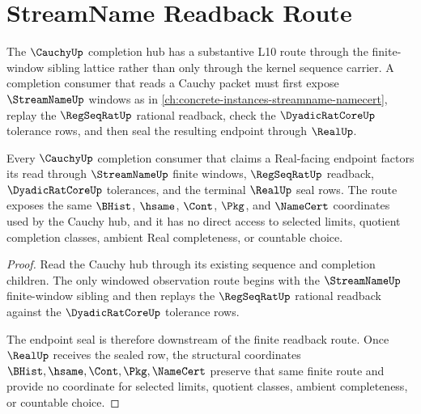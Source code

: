 \section{StreamName Readback Route}
\label{sec:cauchy-orphan-streamname-route}

The $\CauchyUp$ completion hub has a substantive L10 route through the finite-window sibling lattice rather than only through the kernel sequence carrier. A completion consumer that reads a Cauchy packet must first expose $\StreamNameUp$ windows as in \autoref{ch:concrete-instances-streamname-namecert}, replay the $\RegSeqRatUp$ rational readback, check the $\DyadicRatCoreUp$ tolerance rows, and then seal the resulting endpoint through $\RealUp$.

\begin{theorem}
\label{thm:cauchy-orphan-streamname-route}
Every $\CauchyUp$ completion consumer that claims a Real-facing endpoint factors its read through $\StreamNameUp$ finite windows, $\RegSeqRatUp$ readback, $\DyadicRatCoreUp$ tolerances, and the terminal $\RealUp$ seal rows. The route exposes the same $\BHist$, $\hsame$, $\Cont$, $\Pkg$, and $\NameCert$ coordinates used by the Cauchy hub, and it has no direct access to selected limits, quotient completion classes, ambient Real completeness, or countable choice.
\end{theorem}
\begin{proof}
Read the Cauchy hub through its existing sequence and completion children. The only windowed observation route begins with the $\StreamNameUp$ finite-window sibling and then replays the $\RegSeqRatUp$ rational readback against the $\DyadicRatCoreUp$ tolerance rows.

The endpoint seal is therefore downstream of the finite readback route. Once $\RealUp$ receives the sealed row, the structural coordinates $\BHist,\hsame,\Cont,\Pkg,\NameCert$ preserve that same finite route and provide no coordinate for selected limits, quotient classes, ambient completeness, or countable choice.
\end{proof}
